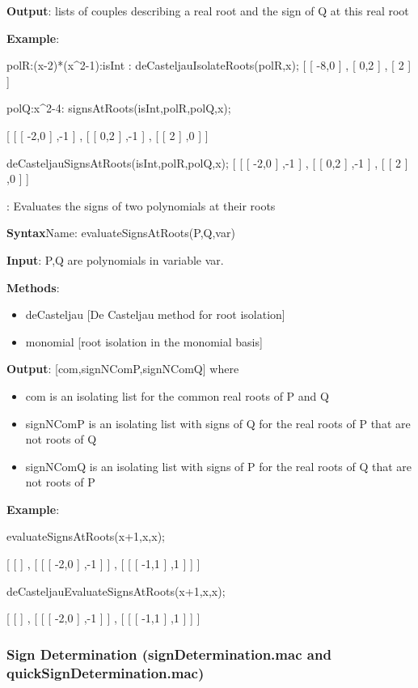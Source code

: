 \documentclass{article}
\begin{document}
{\bf   Output}: lists of couples describing a real root and the sign of Q at this
  real root
  
{\bf Example}:

polR:(x-2)*(x\^{}2-1):isInt :
    deCasteljauIsolateRoots(polR,x);
    [ [ -8,0 ] , [ 0,2 ] , [ 2 ] ]
    
    polQ:x\^{}2-4: signsAtRoots(isInt,polR,polQ,x);
    
    [ [ [ -2,0 ] ,-1 ] , [ [ 0,2 ] ,-1 ] , [ [ 2 ] ,0 ] ]
    
    deCasteljauSignsAtRoots(isInt,polR,polQ,x);
    [ [ [ -2,0 ] ,-1 ] , [ [ 0,2 ] ,-1 ] , [ [ 2 ] ,0 ] ]
  

:
  Evaluates the signs of two polynomials at their roots
  
{\bf Syntax}{Name}: evaluateSignsAtRoots(P,Q,var)
  
{\bf Input}: P,Q are polynomials in variable var.
  
{\bf Methods}:
  \begin{itemize}
    \item deCasteljau [De Casteljau method for root isolation]
    \item {\color{grey} monomial [root isolation in the monomial basis]}
  \end{itemize}
 
 {\bf Output}: [com,signNComP,signNComQ] where
  \begin{itemize}
 \item com is an isolating list for the common real roots of P and Q
    \item signNComP is an isolating list with signs of Q for the real roots of
    P that are not roots of Q
    \item signNComQ is an isolating list with signs of P for the real roots of
    Q that are not roots of P
  \end{itemize}
  
{\bf  Example}:

evaluateSignsAtRoots(x+1,x,x);

[ [ ] , [ [ [ -2,0 ] ,-1 ] ] , [ [ [ -1,1 ] ,1 ] ] ]

deCasteljauEvaluateSignsAtRoots(x+1,x,x);

[ [ ] , [ [ [ -2,0 ] ,-1 ] ] , [ [ [ -1,1 ] ,1 ] ] ]


\subsubsection{Sign Determination (signDetermination.mac and quickSignDetermination.mac)}
\end{document}

